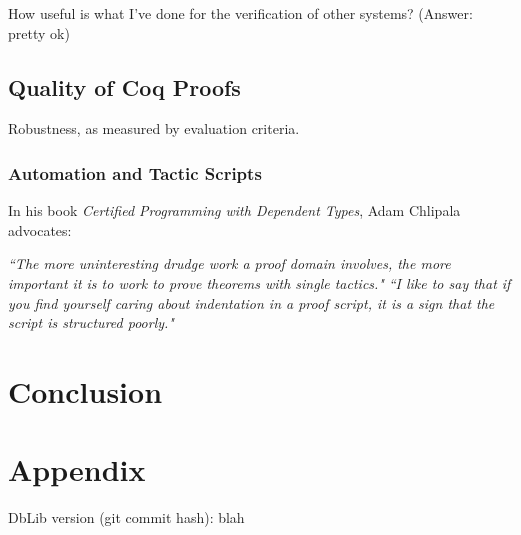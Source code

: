 \documentclass[]{unswthesis}
\let\i\textit
\begin{document}
How useful is what I've done for the verification of other systems? (Answer: pretty ok)

\section{Quality of Coq Proofs}

Robustness, as measured by evaluation criteria.

\subsection{Automation and Tactic Scripts}

In his book \i{Certified Programming with Dependent Types}, Adam Chlipala advocates:

\i{``The more uninteresting drudge work a proof domain involves, the more important it is to work to prove theorems with single tactics."}
\i{``I like to say that if you find yourself caring about indentation in a proof script, it is a sign that the script is structured poorly."}

\chapter{Conclusion}

\backmatter
\pagebreak



\chapter{Appendix}

DbLib version (git commit hash): blah
\end{document}
